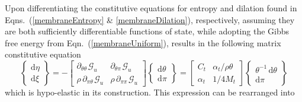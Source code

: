 Upon differentiating the constitutive equations for entropy and dilation found in Eqns.~(\ref{membraneEntropy} \& \ref{membraneDilation}), respectively, assuming they are both sufficiently differentiable functions of state, while adopting the Gibbs free energy from Eqn.~(\ref{membraneUniform}), results in the following matrix constitutive equation
\begin{displaymath}
\left\{ \begin{matrix}
\mathrm{d} \eta \\ \mathrm{d} \xi
\end{matrix} \right\} = -\begin{bmatrix}
\partial_{\theta\theta\,} \mathcal{G}_u & \partial_{\theta\pi\,} \mathcal{G}_u \\
\rho \, \partial_{\pi\theta\,} \mathcal{G}_u & \rho \, \partial_{\pi\pi\,} \mathcal{G}_u
\end{bmatrix} 
\left\{ \begin{matrix}
\mathrm{d} \theta \\ \mathrm{d} \pi
\end{matrix} \right\} = \begin{bmatrix}
C_t & \alpha_t / \rho \theta \\ \alpha_t & 1 / 4 M_t
\end{bmatrix} \left\{ \begin{matrix}
\theta^{-1} \, \mathrm{d} \theta \\ \mathrm{d} \pi
\end{matrix} \right\}
\end{displaymath}
which is hypo-elastic in its construction. \cite{Truesdell55}  This expression can be rearranged into
